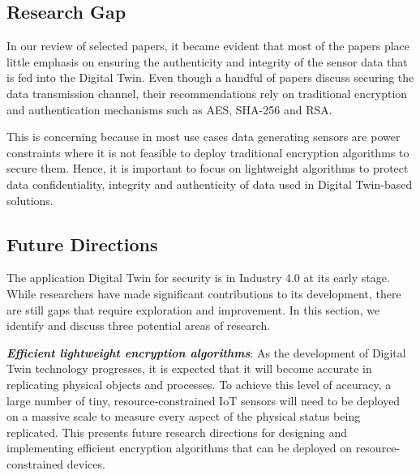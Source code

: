 \subsection{Research Gap}
\label{sec:gap}

In our review of selected papers, it became evident that most of the papers place little emphasis on ensuring the authenticity and integrity of the sensor data that is fed into the Digital Twin. Even though a handful of papers discuss securing the data transmission channel, their recommendations rely on traditional encryption and authentication mechanisms such as AES, SHA-256 and RSA. 

This is concerning because in most use cases data generating sensors are power constraints where it is not feasible to deploy traditional encryption algorithms to secure them. Hence, it is important to focus on lightweight algorithms to protect data confidentiality, integrity and authenticity of data used in Digital Twin-based solutions.



\subsection{Future Directions}

The application Digital Twin for security is in Industry 4.0 at its early stage. While researchers have made significant contributions to its development, there are still gaps that require exploration and improvement. In this section, we identify and discuss three potential areas of research.

\textbf{\textit{Efficient lightweight encryption algorithms}}: As the development of Digital Twin technology progresses, it is expected that it will become accurate in replicating physical objects and processes. To achieve this level of accuracy, a large number of tiny, resource-constrained IoT sensors will need to be deployed on a massive scale to measure every aspect of the physical status being replicated. This presents future research directions for designing and implementing efficient encryption algorithms that can be deployed on resource-constrained devices.



